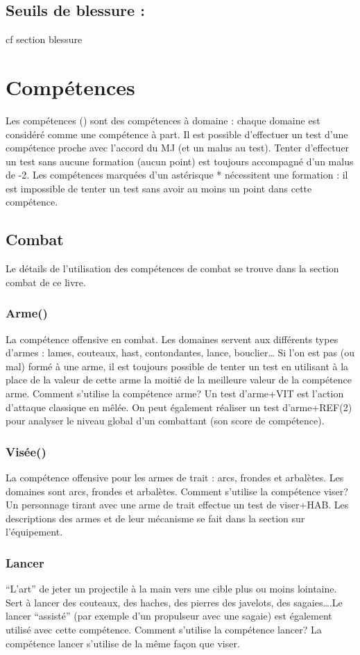 \documentclass[10pt,a4paper,twocolumn]{book}
\begin{document}
\subsection{Seuils de blessure :}
cf section blessure

\section{Compétences}
Les compétences () sont des compétences à domaine : chaque domaine est considéré comme une compétence à part.
Il est possible d’effectuer un test d’une compétence proche avec l’accord du MJ (et un malus au test).
Tenter d’effectuer un test sans aucune formation (aucun point) est toujours accompagné d’un malus de -2.
Les compétences marquées d’un astérisque * nécessitent une formation : il est impossible de tenter un test sans avoir au moins un point dans cette compétence.


\subsection{Combat}
Le détails de l’utilisation des compétences de combat se trouve dans la section combat de ce livre.
\subsubsection{Arme()}
La compétence offensive en combat. Les domaines servent aux différents types d’armes : lames, couteaux, hast, contondantes, lance, bouclier…
Si l’on est pas (ou mal)  formé à une arme, il est toujours possible de tenter un test en utilisant à la place de la valeur de cette arme la moitié de la meilleure valeur de la compétence arme.
Comment s’utilise la compétence arme?
Un test d’arme+VIT est l’action d’attaque classique en mêlée. On peut également réaliser un test d’arme+REF(2) pour analyser le niveau global d’un combattant (son score de compétence).
\subsubsection{Visée()}
La compétence offensive pour les armes de trait : arcs, frondes et arbalètes.
Les domaines sont arcs, frondes et arbalètes.
Comment s’utilise la compétence viser?
Un personnage tirant avec une arme de trait effectue un test de viser+HAB. Les descriptions des armes et de leur mécanisme se fait dans la section sur l’équipement.
\subsubsection{Lancer}
“L’art” de jeter un projectile à la main vers une cible plus ou moins lointaine. Sert à lancer des couteaux, des haches, des pierres des javelots, des sagaies….Le lancer “assisté” (par exemple d’un propulseur avec une sagaie) est également utilisé avec cette compétence. 
Comment s’utilise la compétence lancer?
La compétence lancer s’utilise de la même façon que viser.
\end{document}
